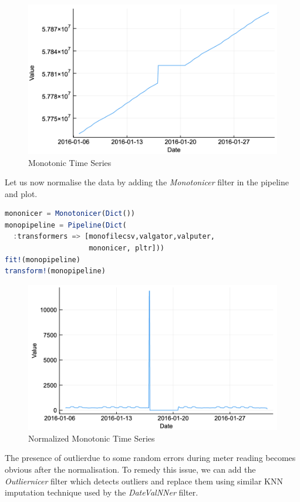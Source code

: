 \documentclass{juliacon}
\begin{document}
\begin{figure}[htbp]
   \centering
   \includegraphics[width=0.9\columnwidth]{mono.png} %
   \caption{Monotonic Time Series}
   \label{fig:mono}
\end{figure}

Let us now normalise the data by adding the \emph{Monotonicer} filter in the pipeline and plot.
\begin{lstlisting}[language = Julia]
mononicer = Monotonicer(Dict())
monopipeline = Pipeline(Dict(
  :transformers => [monofilecsv,valgator,valputer,
                    mononicer, pltr]))
fit!(monopipeline) 
transform!(monopipeline)
\end{lstlisting}

\begin{figure}[htbp]
   \centering
   \includegraphics[width=\columnwidth]{mononicer.png} %
   \caption{Normalized Monotonic Time Series}
   \label{fig:nmono}
\end{figure}

The presence of outlierdue to some random errors during meter reading  becomes obvious after the normalisation. To remedy this issue, we can add the \emph{Outliernicer} filter which detects outliers and replace them using similar KNN imputation technique used by the \emph{DateValNNer} filter.
\end{document}

